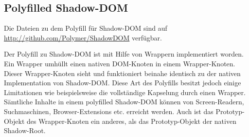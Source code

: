\subsection{Polyfilled Shadow-DOM}
\label{sec:4_Polymer_PShadowDOM}

Die Dateien zu dem Polyfill für Shadow-DOM sind auf \url{http://github.com/Polymer/ShadowDOM} verfügbar.

Der Polyfill zu Shadow-DOM ist mit Hilfe von Wrappern implementiert worden. Ein Wrapper umhüllt einen nativen DOM-Knoten in einem Wrapper-Knoten. Dieser Wrapper-Knoten sieht und funktioniert beinahe identisch zu der nativen Implementation von Shadow-DOM. Diese Art des Polyfills besitzt jedoch einige Limitationen wie beispielsweise die vollständige Kapselung durch einen Wrapper. Sämtliche Inhalte in einem polyfilled Shadow-DOM können von Screen-Readern, Suchmaschinen, Browser-Extensions etc. erreicht werden. Auch ist das Prototyp-Objekt des Wrapper-Knoten ein anderes, als das Prototyp-Objekt der nativen Shadow-Root.